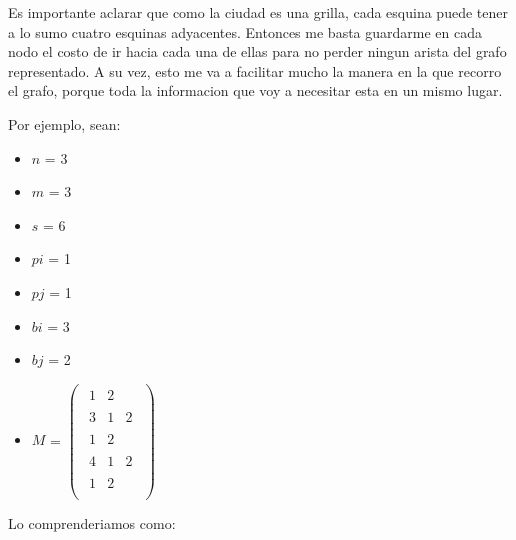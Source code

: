 Es importante aclarar que como la ciudad es una grilla, cada esquina puede tener a lo sumo cuatro esquinas adyacentes. Entonces me basta guardarme en cada nodo el costo de ir hacia cada una de ellas para no perder ningun arista del grafo representado. A su vez, esto me va a facilitar mucho la manera en la que recorro el grafo, porque toda la informacion que voy a necesitar esta en un mismo lugar.

\medskip

Por ejemplo, sean:

\medskip
\begin{multicols}{3}
  \begin{itemize}[]
      \item $n$ = 3
      \item $m$ = 3
      \item $s$ = 6
    \end{itemize}
\columnbreak
  \begin{itemize}[]
      \item $pi$ = 1
      \item $pj$ = 1
      \item $bi$ = 3
      \item $bj$ = 2
    \end{itemize}
\columnbreak
  \begin{itemize}[]
      \item $M$ =
        $
        \begin{pmatrix}
        \begin{matrix} 1 & 2 \end{matrix}\\
        \begin{matrix}3 & 1 & 2 \end{matrix}\\
        \begin{matrix} 1 & 2 \end{matrix}\\
        \begin{matrix}4 & 1 & 2 \end{matrix}\\
        \begin{matrix} 1 & 2 \end{matrix}\\
        \end{pmatrix}
        $
    \end{itemize}
\end{multicols}
\medskip

Lo comprenderiamos como:

